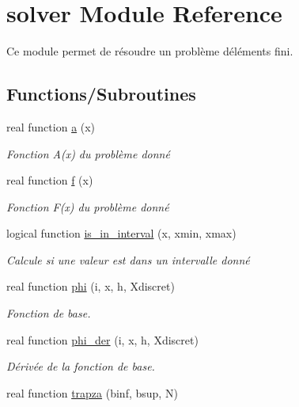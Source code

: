 \hypertarget{namespacesolver}{}\section{solver Module Reference}
\label{namespacesolver}


Ce module permet de résoudre un problème d\textquotesingle{}éléments fini.  


\subsection*{Functions/\+Subroutines}
\begin{DoxyCompactItemize}
\item 
real function \hyperlink{namespacesolver_ab0081bb7880652eb26e65994f13fcb54}{a} (x)
\begin{DoxyCompactList}\small\item\em Fonction A(x) du problème donné \end{DoxyCompactList}\item 
real function \hyperlink{namespacesolver_a6f4d43c88c7c8ebdea64bd45e002af05}{f} (x)
\begin{DoxyCompactList}\small\item\em Fonction F(x) du problème donné \end{DoxyCompactList}\item 
logical function \hyperlink{namespacesolver_a2380e35eaa6fcef040f90bb5b23baa6a}{is\+\_\+in\+\_\+interval} (x, xmin, xmax)
\begin{DoxyCompactList}\small\item\em Calcule si une valeur est dans un intervalle donné \end{DoxyCompactList}\item 
real function \hyperlink{namespacesolver_a3323b7ad7f72685a465733177c82e8cc}{phi} (i, x, h, Xdiscret)
\begin{DoxyCompactList}\small\item\em Fonction de base. \end{DoxyCompactList}\item 
real function \hyperlink{namespacesolver_add1e5803b09e373fde46731960030e42}{phi\+\_\+der} (i, x, h, Xdiscret)
\begin{DoxyCompactList}\small\item\em Dérivée de la fonction de base. \end{DoxyCompactList}\item 
real function \hyperlink{namespacesolver_a5cdc774a6979796cb6b072b2fbb0e5af}{trapza} (binf, bsup, N)

\end{DoxyCompactItemize}
